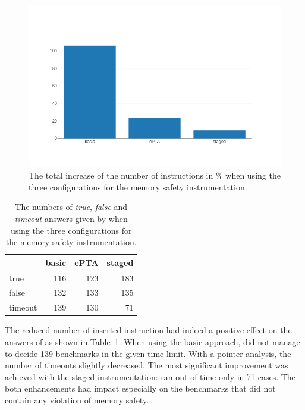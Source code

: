 \begin{figure}[h]
  \includegraphics[width=\textwidth]{charts/bar_chart.png}
  \caption{The total increase of the number of instructions in \% when using
  the three configurations for the memory safety instrumentation.}
  \label{fig:increase_chart}
\end{figure}

\begin{table}[t]
\begin{tabular}{|l || r | r | r|}
 \hline
 & basic & ePTA & staged \\
 \hline
 \hline
 true     & 116 & 123  & 183 \\
 \hline
 false    & 132 & 133  & 135 \\
 \hline
 timeout  & 139 & 130  & 71 \\
 \hline
\end{tabular}
\caption{The numbers of \emph{true}, \emph{false} and \emph{timeout} answers
given by \symbiotic when using the three configurations for the memory safety
instrumentation.}
\label{tab:answers}

\end{table}

The reduced number of inserted instruction had indeed a positive effect on the
answers of \symbiotic as shown in Table~\ref{tab:answers}. When using the basic
approach, \symbiotic did not manage to decide 139 benchmarks in the given time
limit. With a pointer analysis, the number of timeouts slightly decreased. The
most significant improvement was achieved with the staged instrumentation:
\symbiotic ran out of time only in 71 cases. The both enhancements had impact
especially on the benchmarks that did not contain any violation of memory
safety.

